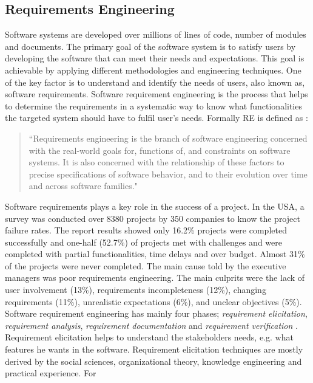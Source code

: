 \subsection{Requirements Engineering}

Software systems are developed over millions of lines of code, number of modules
and documents. The primary goal of the software system is to satisfy users by
developing the software that can meet their needs and expectations. This goal is
achievable by applying different methodologies and engineering techniques. One
of the key factor is to understand and identify the needs of users, also known
as, software requirements. Software requirement engineering is the process that
helps to determine the requirements in a systematic way to know what
functionalities the targeted system should have to fulfil user's needs. Formally
RE is defined as \cite{Zave:1997:CRE:267580.267581}:\\
\begin{quote}
``Requirements engineering is the branch of software engineering concerned with the real-world
goals for, functions of, and constraints on software systems. It is also concerned with the
relationship of these factors to precise specifications of software behavior, and to their evolution
over time and across software families."
\end{quote}
Software requirements plays a key role in the success of a project. In the USA, a
survey was conducted over 8380 projects by 350 companies to know the project
failure rates. The report \cite{StandishReport} results showed only 16.2\% projects were
completed successfully and one-half (52.7\%) of projects met with challenges and
were completed with partial functionalities, time delays and over budget. Almost
31\% of the projects were never completed. The main cause told by the executive
managers was poor requirements engineering. The main culprits were the lack of
user involvement (13\%), requirements incompleteness (12\%), changing requirements
(11\%), unrealistic expectations (6\%), and unclear objectives
(5\%). \\
Software requirement engineering has mainly four phases; \emph{requirement
elicitation}, \emph{requirement analysis}, \emph{requirement documentation} and
\emph{requirement verification} \cite {Kotonya:1998}. Requirement elicitation
\cite{Coughlan:2002, Zowghi2005} helps to understand the
stakeholders needs, e.g. what features he wants in the software.
Requirement elicitation techniques are mostly derived by the social sciences,
organizational theory, knowledge engineering and practical experience. For
